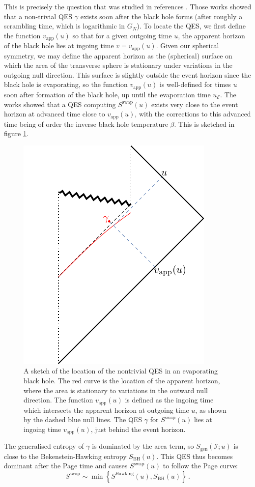 \documentclass[letterpaper,12pt]{article}
\newcommand*{\evap}{\mathscr{E}} %
\newcommand*{\island}{\mathcal{I}}
\begin{document}
This is precisely the question that was studied in references \cite{Penington:2019npb,Almheiri:2019psf}.  Those works showed that a non-trivial QES $\gamma$ exists soon after the black hole forms (after roughly a scrambling time, which is logarithmic in $G_N$). To locate the QES, we first define the function $v_\mathrm{app}(u)$ so that for a given outgoing time $u$, the apparent horizon of the black hole lies at ingoing time $v=v_\mathrm{app}(u)$. Given our spherical symmetry, we may define the apparent horizon  as the (spherical) surface on which the area of the transverse sphere is stationary under variations in the outgoing null direction. This surface is slightly outside the event horizon since the black hole is evaporating, so the function $v_\mathrm{app}(u)$ is well-defined for times $u$ soon after formation of the black hole, up until the evaporation time $u_\evap$. The works \cite{Penington:2019npb,Almheiri:2019psf} showed that a QES computing $S^\mathrm{swap}(u)$ exists very close to the event horizon at advanced time close to $v_\mathrm{app}(u)$, with the corrections to this advanced time being of order the inverse black hole temperature $\beta$. This is sketched in figure \ref{fig:EvaporatingQES}.
\begin{figure}
\centering
	\includegraphics[width=.4\textwidth]{EvaporateQES.pdf}
\caption{A sketch of the location of the nontrivial QES in an evaporating black hole. The red curve is the location of the apparent horizon, where the area is stationary to variations in the outward null direction. The function $v_\mathrm{app}(u)$ is defined as the ingoing time which intersects the apparent horizon at outgoing time $u$, as shown by the dashed blue null lines. The QES $\gamma$ for $S^\mathrm{swap}(u)$ lies at ingoing time  $v_\mathrm{app}(u)$, just behind the event horizon.\label{fig:EvaporatingQES}}
\end{figure}


The generalised entropy of $\gamma$ is dominated by the area term,  so $S_\mathrm{gen}(\island;u)$ is close to the Bekenstein-Hawking entropy $S_\mathrm{BH}(u)$. This QES thus becomes dominant after the Page time and causes $S^\mathrm{swap}(u)$ to follow the Page curve:
\begin{equation}\label{eq:Page}
	S^\mathrm{swap} \sim \min\left\{ S^\mathrm{Hawking}(u) , S_\mathrm{BH}(u) \right\}\, .
\end{equation}
\end{document}
